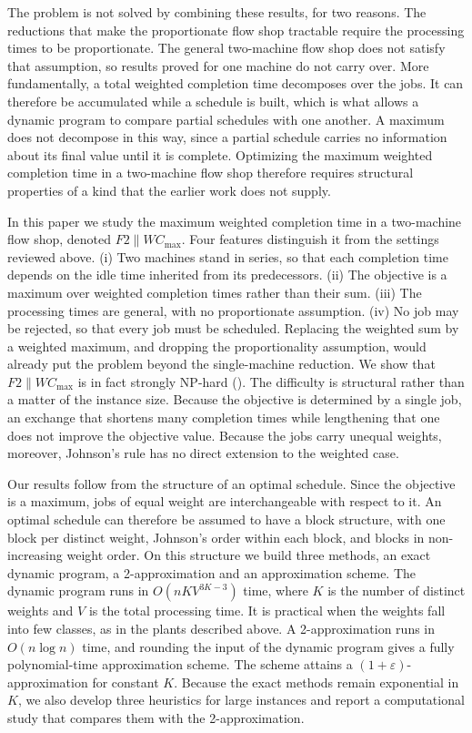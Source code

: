\documentclass[12pt]{article}
\begin{document}
\begin{sloppypar}
The problem is not solved by combining these results, for two reasons. The reductions
that make the proportionate flow shop tractable require the processing times to be
proportionate. The general two-machine flow shop does not satisfy that assumption, so
results proved for one machine do not carry over. More fundamentally, a total weighted
completion time decomposes over the jobs. It can therefore be accumulated while a
schedule is built, which is what allows a dynamic program to compare partial schedules
with one another. A maximum does not decompose in this way, since a partial schedule
carries no information about its final value until it is complete. Optimizing the maximum
weighted completion time in a two-machine flow shop therefore requires structural
properties of a kind that the earlier work does not supply.

In this paper we study the maximum weighted completion time in a two-machine flow shop,
denoted $F2 \parallel WC_{\max}$. Four features distinguish it from the settings reviewed
above. (i) Two machines stand in series, so that each completion time depends on the idle
time inherited from its predecessors. (ii) The objective is a maximum over weighted
completion times rather than their sum. (iii) The processing times are general, with no
proportionate assumption. (iv) No job may be rejected, so that every job must be
scheduled. Replacing the weighted sum by a weighted maximum, and dropping the
proportionality assumption, would already put the problem beyond the single-machine
reduction. We show that $F2 \parallel WC_{\max}$ is in fact strongly NP-hard
(). The difficulty is structural rather than a matter of the instance
size. Because the objective is determined by a single job, an exchange that shortens many
completion times while lengthening that one does not improve the objective value. Because
the jobs carry unequal weights, moreover, Johnson's rule has no direct extension to the
weighted case.

Our results follow from the structure of an optimal schedule. Since the objective is a
maximum, jobs of equal weight are interchangeable with respect to it. An optimal
schedule can therefore be assumed to have a block structure, with one block per distinct
weight, Johnson's order within each block, and blocks in non-increasing weight order.
On this structure we build three methods, an exact dynamic program, a 2-approximation and
an approximation scheme. The dynamic program runs in $O(nKV^{3K-3})$ time, where $K$ is the
number of distinct weights and $V$ is the total processing time. It is practical when the
weights fall into few classes, as in the plants described above. A 2-approximation runs in
$O(n\log n)$ time, and rounding the input of the dynamic program gives a fully
polynomial-time approximation scheme. The scheme attains a $(1+\varepsilon)$-approximation
for constant $K$. Because the exact methods remain exponential in $K$, we also develop three
heuristics for large instances and report a computational study that compares them with the
2-approximation.


\end{sloppypar}
\end{document}
